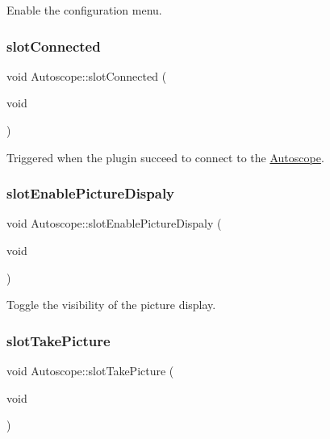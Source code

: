 Enable the configuration menu. 

\mbox{\label{class_autoscope_ae85d6642b5db861e226a6a261c5c0a37}} 
\subsubsection{\texorpdfstring{slotConnected}{slotConnected}}
{\footnotesize\ttfamily void Autoscope\+::slot\+Connected (\begin{DoxyParamCaption}\item[{void}]{ }\end{DoxyParamCaption})\hspace{0.3cm}{\ttfamily [slot]}}



Triggered when the plugin succeed to connect to the \mbox{\hyperlink{class_autoscope}{Autoscope}}. 

\mbox{\label{class_autoscope_a9216c1ee654d8da28d331b3020b6e27d}} 
\subsubsection{\texorpdfstring{slotEnablePictureDispaly}{slotEnablePictureDispaly}}
{\footnotesize\ttfamily void Autoscope\+::slot\+Enable\+Picture\+Dispaly (\begin{DoxyParamCaption}\item[{void}]{ }\end{DoxyParamCaption})\hspace{0.3cm}{\ttfamily [slot]}}



Toggle the visibility of the picture display. 

\mbox{\label{class_autoscope_a55c4956c3a71198b70cf19fea503a776}} 
\subsubsection{\texorpdfstring{slotTakePicture}{slotTakePicture}}
{\footnotesize\ttfamily void Autoscope\+::slot\+Take\+Picture (\begin{DoxyParamCaption}\item[{void}]{ }\end{DoxyParamCaption})\hspace{0.3cm}{\ttfamily [slot]}}



